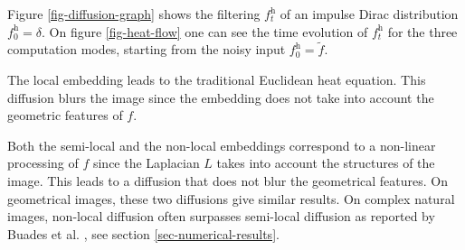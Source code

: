 \documentclass[final]{siamltex}
\newcommand{\heat}{\text{h}}
\newcommand{\F}{f}
\newcommand{\tF}{\tilde \F}
\begin{document}
Figure \ref{fig-diffusion-graph} shows the filtering $\F_t^{\heat}$ of an impulse Dirac distribution $\F_0^{\heat}=\delta$. On figure \ref{fig-heat-flow} one can see the time evolution of $\F_t^{\heat}$ for the three computation modes, starting from the noisy input $\F_0^{\heat} = \tF$.
\begin{rs}
	\item The local embedding leads to the traditional Euclidean heat equation. This diffusion blurs the image since the embedding does not take into account the geometric features of $f$.
	\item Both the semi-local and the non-local embeddings correspond to a non-linear processing of $\F$ since the Laplacian $L$ takes into account the structures of the image. This leads to a diffusion that does not blur the geometrical features. On geometrical images, these two diffusions give similar results. On complex natural images, non-local diffusion often surpasses semi-local diffusion as reported by Buades et al. \cite{buades-nl-means}, see section \ref{sec-numerical-results}. %
\end{rs}
\end{document}
